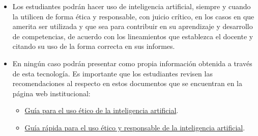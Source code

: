 {    \begin{itemize}
      \item Los estudiantes podrán hacer uso de inteligencia artificial, siempre y cuando la utilicen de forma ética y responsable, con juicio crítico, en los casos en que amerita ser utilizada y que sea para contribuir en su aprendizaje y desarrollo de competencias, de acuerdo con los lineamientos que establezca el docente y citando su uso de la forma correcta en sus informes.
      \item En ningún caso podrán presentar como propia información obtenida a través de esta tecnología. Es importante que los estudiantes revisen las recomendaciones al respecto en estos documentos que se encuentran en la página web institucional: 
      \begin{itemize}[label=-]
        \item \href{https://res.cloudinary.com/webuvg/image/upload/v1737393102/WEB/Nosotros/reglamentos/2025/guia-ia-estudiantes.pdf}{Guía para el uso ético de la inteligencia artificial}.
         \item \href{https://res.cloudinary.com/webuvg/image/upload/v1737393102/WEB/Nosotros/reglamentos/2025/politica-ia-uvg.pdf}{Guía rápida para el uso ético y responsable de la inteligencia artificial}.
      \end{itemize}
    \end{itemize}
}
